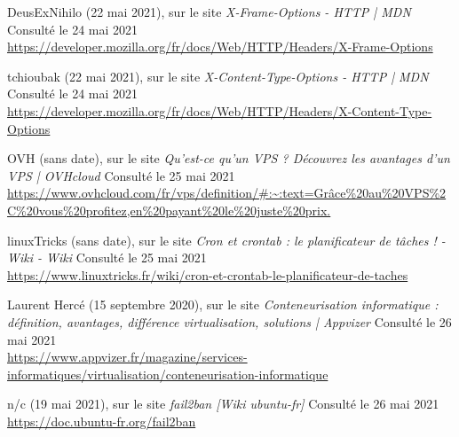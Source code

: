 \begin{thebibliography}{}
DeusExNihilo (22 mai 2021), sur le site \textit{X-Frame-Options - HTTP | MDN} Consulté le 24 mai 2021
\\\url{https://developer.mozilla.org/fr/docs/Web/HTTP/Headers/X-Frame-Options}

tchioubak (22 mai 2021), sur le site \textit{X-Content-Type-Options - HTTP | MDN} Consulté le 24 mai 2021
\\\url{https://developer.mozilla.org/fr/docs/Web/HTTP/Headers/X-Content-Type-Options}

OVH (sans date), sur le site \textit{Qu'est-ce qu'un VPS ? Découvrez les avantages d'un VPS | OVHcloud} Consulté le 25 mai 2021
\\\url{https://www.ovhcloud.com/fr/vps/definition/#:~:text=Grâce%20au%20VPS%2C%20vous%20profitez,en%20payant%20le%20juste%20prix.}

linuxTricks (sans date), sur le site \textit{Cron et crontab : le planificateur de tâches ! - Wiki - Wiki} Consulté le 25 mai 2021
\\\url{https://www.linuxtricks.fr/wiki/cron-et-crontab-le-planificateur-de-taches}

Laurent Hercé (15 septembre 2020), sur le site \textit{Conteneurisation informatique : définition, avantages, différence virtualisation, solutions | Appvizer} Consulté le 26 mai 2021
\\\url{https://www.appvizer.fr/magazine/services-informatiques/virtualisation/conteneurisation-informatique}

n/c (19 mai 2021), sur le site \textit{fail2ban [Wiki ubuntu-fr]} Consulté le 26 mai 2021
\\\url{https://doc.ubuntu-fr.org/fail2ban}

\end{thebibliography}



